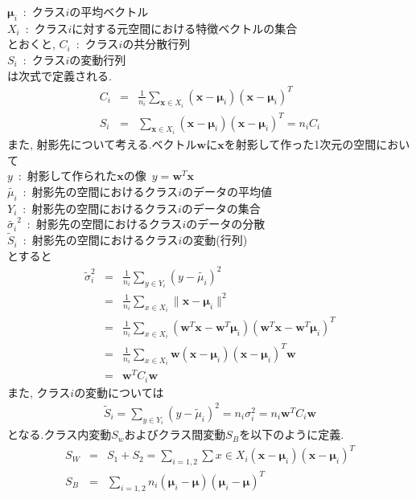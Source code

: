 \documentclass[dvipdfmx,a4j]{jsarticle}
\begin{document}
  $\bm{\mu}_{i}$\ :\ クラス$i$の平均ベクトル\\
  $X_{i}$\ :\ クラス$i$に対する元空間における特徴ベクトルの集合\\
  とおくと,
  $C_{i}$\ :\ クラス$i$の共分散行列\\
  $S_{i}$\ :\ クラス$i$の変動行列\\
  は次式で定義される.
  \begin{eqnarray*}
    C_{i}&=&\frac{1}{n_{i}}\sum_{\bm{x}\in X_{i}}(\bm{x}-\bm{\mu}_{i})(\bm{x}-\bm{\mu}_{i})^{T}\\
    S_{i}&=&\sum_{\bm{x}\in X_{i}}(\bm{x}-\bm{\mu}_{i})(\bm{x}-\bm{\mu}_{i})^{T}=n_{i}C_{i}
  \end{eqnarray*}
  また, 射影先について考える.ベクトル$\bm{w}$に$\bm{x}$を射影して作った1次元の空間において\\
  $y$\ :\ 射影して作られた$\bm{x}$の像\ $y=\bm{w}^{T}\bm{x}$\\
  $\tilde{\mu_{i}}$\  :\ 射影先の空間におけるクラス$i$のデータの平均値\\
  $Y_{i}$\ :\ 射影先の空間におけるクラス$i$のデータの集合\\
  $\tilde{\sigma_{i}}^{2}$\ :\ 射影先の空間におけるクラス$i$のデータの分散\\
  $\tilde{S}_{i}$\ :\ 射影先の空間におけるクラス$i$の変動(行列)\\
  とすると
  \begin{eqnarray*}
    \tilde{\sigma}_{i}^{2}&=&\frac{1}{n_{i}}\sum_{y\in Y_{i}}(y-\tilde{\mu_{i}})^{2}\\
                          &=&\frac{1}{n_{i}}\sum_{x\in X_{i}}\|\bm{x}-\bm{\mu}_{i}\|^{2}\\
                          &=&\frac{1}{n_{i}}\sum_{x\in X_{i}}(\bm{w}^{T}\bm{x}-\bm{w}^{T}\bm{\mu}_{i})(\bm{w}^{T}\bm{x}-\bm{w}^{T}\bm{\mu}_{i})^{T}\\
                          &=&\frac{1}{n_{i}}\sum_{x\in X_{i}}\bm{w}(\bm{x}-\bm{\mu}_{i})(\bm{x}-\bm{\mu}_{i})^{T}\bm{w}\\
                          &=&\bm{w}^{T}C_{i}\bm{w}
  \end{eqnarray*}
  また, クラス$i$の変動については
  \begin{eqnarray*}
    \tilde{S}_{i}=\sum_{y\in Y_{i}}(y-\tilde{\mu}_{i})^{2}=n_{i}\sigma_{i}^{2}=n_{i}\bm{w}^{T}C_{i}\bm{w}
  \end{eqnarray*}
  となる.クラス内変動$S_{w}$およびクラス間変動$S_{B}$を以下のように定義.
  \begin{eqnarray*}
    S_{W}&=&S_{1}+S_{2}=\sum_{i=1,2}\sum{x\in X_{i}}(\bm{x}-\bm{\mu}_{i})(\bm{x}-\bm{\mu}_{i})^{T}\\
    S_{B}&=&\sum_{i=1,2}n_{i}(\bm{\mu}_{i}-\bm{\mu})(\bm{\mu}_{i}-\bm{\mu})^{T}
  \end{eqnarray*}
\end{document}
